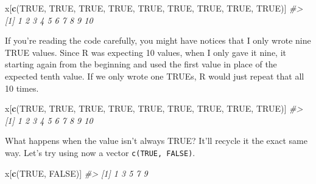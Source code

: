\documentclass[
  12pt,
]{book}
\newenvironment{Shaded}{\begin{snugshade}}{\end{snugshade}}
\newcommand{\CommentTok}[1]{\textcolor[rgb]{0.56,0.35,0.01}{\textit{#1}}}
\newcommand{\KeywordTok}[1]{\textcolor[rgb]{0.13,0.29,0.53}{\textbf{#1}}}
\newcommand{\NormalTok}[1]{#1}
\newcommand{\OtherTok}[1]{\textcolor[rgb]{0.56,0.35,0.01}{#1}}
\begin{document}
\begin{Shaded}
\begin{Highlighting}[]
\NormalTok{x[}\KeywordTok{c}\NormalTok{(}\OtherTok{TRUE}\NormalTok{, }\OtherTok{TRUE}\NormalTok{, }\OtherTok{TRUE}\NormalTok{, }\OtherTok{TRUE}\NormalTok{, }\OtherTok{TRUE}\NormalTok{, }\OtherTok{TRUE}\NormalTok{, }\OtherTok{TRUE}\NormalTok{, }\OtherTok{TRUE}\NormalTok{, }\OtherTok{TRUE}\NormalTok{)]}
\CommentTok{\#>  [1]  1  2  3  4  5  6  7  8  9 10}
\end{Highlighting}
\end{Shaded}

If you're reading the code carefully, you might have notices that I only wrote nine TRUE values. Since R was expecting 10 values, when I only gave it nine, it starting again from the beginning and used the first value in place of the expected tenth value. If we only wrote one TRUEs, R would just repeat that all 10 times.

\begin{Shaded}
\begin{Highlighting}[]
\NormalTok{x[}\KeywordTok{c}\NormalTok{(}\OtherTok{TRUE}\NormalTok{, }\OtherTok{TRUE}\NormalTok{, }\OtherTok{TRUE}\NormalTok{, }\OtherTok{TRUE}\NormalTok{, }\OtherTok{TRUE}\NormalTok{, }\OtherTok{TRUE}\NormalTok{, }\OtherTok{TRUE}\NormalTok{, }\OtherTok{TRUE}\NormalTok{, }\OtherTok{TRUE}\NormalTok{)]}
\CommentTok{\#>  [1]  1  2  3  4  5  6  7  8  9 10}
\end{Highlighting}
\end{Shaded}

What happens when the value isn't always TRUE? It'll recycle it the exact same way. Let's try using now a vector \texttt{c(TRUE,\ FALSE)}.

\begin{Shaded}
\begin{Highlighting}[]
\NormalTok{x[}\KeywordTok{c}\NormalTok{(}\OtherTok{TRUE}\NormalTok{, }\OtherTok{FALSE}\NormalTok{)]}
\CommentTok{\#> [1] 1 3 5 7 9}
\end{Highlighting}
\end{Shaded}
\end{document}
